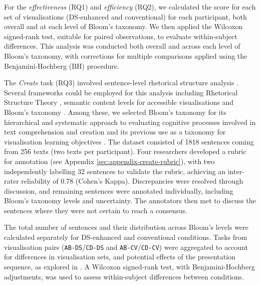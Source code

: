 For the \textit{effectiveness} (RQ1) and \textit{efficiency} (RQ2), we calculated the score for each set of visualisations (DS-enhanced and conventional) for each participant, both overall and at each level of Bloom's taxonomy. We then applied the Wilcoxon signed-rank test, suitable for paired observations, to evaluate within-subject differences. This analysis was conducted both overall and across each level of Bloom's taxonomy, with corrections for multiple comparisons applied using the Benjamini-Hochberg (BH) procedure.

The \textit{Create} task (RQ3) involved sentence-level rhetorical structure analysis \cite{mann1987rhetorical}. Several frameworks could be employed for this analysis including Rhetorical Structure Theory \cite{burstein2003finding}, semantic content levels for accessible visualisations \cite{lundgard2022accessible} and Bloom’s taxonomy \cite{adar2021communicative,iqbal2023towards, iqbal2024towards}. Among these, we selected Bloom’s taxonomy for its hierarchical and systematic approach to evaluating cognitive processes involved in text comprehension and creation \cite{iqbal2023towards, iqbal2024towards} and its previous use as a taxonomy for visualisation learning objectives \cite{adar2021communicative,leerobbins2022learning, shao2024datastorytelling}.  The dataset consisted of 1818 sentences coming from 256 texts (two texts per participant). Four researchers developed a rubric for annotation (see Appendix \ref{sec:appendix-create-rubric}), with two independently labelling 32 sentences to validate the rubric, achieving an inter-rater reliability of 0.78 (Cohen's Kappa). Discrepancies were resolved through discussion, and remaining sentences were annotated individually, including Bloom’s taxonomy levels and uncertainty. The annotators then met to discuss the sentences where they were not certain to reach a consensus. 

The total number of sentences and their distribution across Bloom's levels were calculated separately for DS-enhanced and conventional conditions. Tasks from visualisation pairs (\texttt{AB-DS}/\texttt{CD-DS} and \texttt{AB-CV}/\texttt{CD-CV}) were aggregated to account for differences in visualisation sets, and potential effects of the presentation sequence, as explored in  \citet{hullman2013deeper}. A Wilcoxon signed-rank test, with Benjamini-Hochberg adjustments, was used to assess within-subject differences between conditions.

